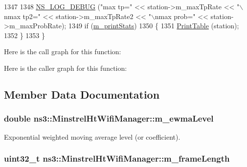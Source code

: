 \begin{DoxyCode}
1347 
1348   \hyperlink{group__logging_ga413f1886406d49f59a6a0a89b77b4d0a}{NS\_LOG\_DEBUG} (\textcolor{stringliteral}{"max tp="} << station->m\_maxTpRate << \textcolor{stringliteral}{"\(\backslash\)nmax tp2="} <<  station->m\_maxTpRate2 << \textcolor{stringliteral}{
      "\(\backslash\)nmax prob="} << station->m\_maxProbRate);
1349   \textcolor{keywordflow}{if} (\hyperlink{classns3_1_1MinstrelHtWifiManager_a0e2d19e84336ab6d788afd81a6ba9cdb}{m\_printStats})
1350     \{
1351       \hyperlink{classns3_1_1MinstrelHtWifiManager_a434fb6aadb02a74cc097ba54b7b02cb3}{PrintTable} (station);
1352     \}
1353 \}
\end{DoxyCode}


Here is the call graph for this function\+:




Here is the caller graph for this function\+:




\subsection{Member Data Documentation}
\subsubsection[{\texorpdfstring{m\+\_\+ewma\+Level}{m_ewmaLevel}}]{\setlength{\rightskip}{0pt plus 5cm}double ns3\+::\+Minstrel\+Ht\+Wifi\+Manager\+::m\+\_\+ewma\+Level\hspace{0.3cm}{\ttfamily [private]}}\hypertarget{classns3_1_1MinstrelHtWifiManager_ace0a340f6c702f416f3dc9fed71105d1}{}\label{classns3_1_1MinstrelHtWifiManager_ace0a340f6c702f416f3dc9fed71105d1}


Exponential weighted moving average level (or coefficient). 

\subsubsection[{\texorpdfstring{m\+\_\+frame\+Length}{m_frameLength}}]{\setlength{\rightskip}{0pt plus 5cm}uint32\+\_\+t ns3\+::\+Minstrel\+Ht\+Wifi\+Manager\+::m\+\_\+frame\+Length\hspace{0.3cm}{\ttfamily [private]}}\hypertarget{classns3_1_1MinstrelHtWifiManager_a069e6a4b77dc080d720a4b076cd8d7c5}{}\label{classns3_1_1MinstrelHtWifiManager_a069e6a4b77dc080d720a4b076cd8d7c5}


